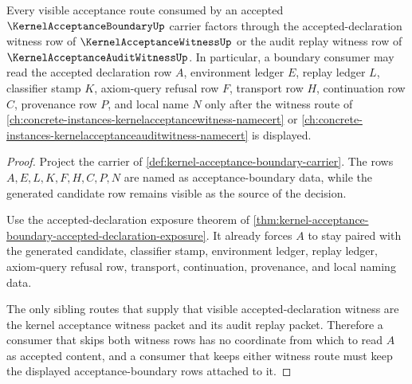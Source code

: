 \begin{theorem}
\label{thm:kernel-acceptance-boundary-kernel-acceptance-witness-dependency}
Every visible acceptance route consumed by an accepted $\KernelAcceptanceBoundaryUp$ carrier factors through the accepted-declaration witness row of $\KernelAcceptanceWitnessUp$ or the audit replay witness row of $\KernelAcceptanceAuditWitnessUp$. In particular, a boundary consumer may read the accepted declaration row $A$, environment ledger $E$, replay ledger $L$, classifier stamp $K$, axiom-query refusal row $F$, transport row $H$, continuation row $C$, provenance row $P$, and local name $N$ only after the witness route of \autoref{ch:concrete-instances-kernelacceptancewitness-namecert} or \autoref{ch:concrete-instances-kernelacceptanceauditwitness-namecert} is displayed.
\end{theorem}
\begin{proof}
Project the carrier of \autoref{def:kernel-acceptance-boundary-carrier}. The rows $A,E,L,K,F,H,C,P,N$ are named as acceptance-boundary data, while the generated candidate row remains visible as the source of the decision.

Use the accepted-declaration exposure theorem of \autoref{thm:kernel-acceptance-boundary-accepted-declaration-exposure}. It already forces $A$ to stay paired with the generated candidate, classifier stamp, environment ledger, replay ledger, axiom-query refusal row, transport, continuation, provenance, and local naming data.

The only sibling routes that supply that visible accepted-declaration witness are the kernel acceptance witness packet and its audit replay packet. Therefore a consumer that skips both witness rows has no coordinate from which to read $A$ as accepted content, and a consumer that keeps either witness route must keep the displayed acceptance-boundary rows attached to it.
\end{proof}

